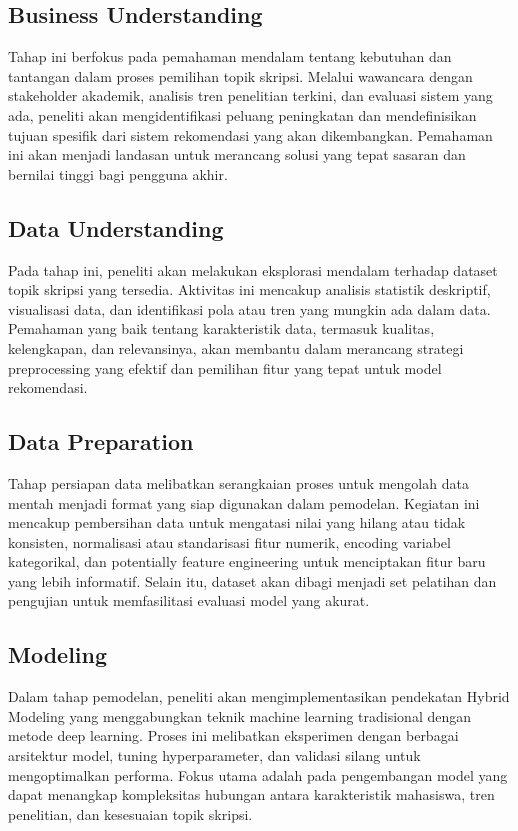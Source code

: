 \subsection{Business Understanding}
Tahap ini berfokus pada pemahaman mendalam tentang kebutuhan dan tantangan dalam proses pemilihan topik skripsi. Melalui wawancara dengan stakeholder akademik, analisis tren penelitian terkini, dan evaluasi sistem yang ada, peneliti akan mengidentifikasi peluang peningkatan dan mendefinisikan tujuan spesifik dari sistem rekomendasi yang akan dikembangkan. Pemahaman ini akan menjadi landasan untuk merancang solusi yang tepat sasaran dan bernilai tinggi bagi pengguna akhir.

\subsection{Data Understanding}
Pada tahap ini, peneliti akan melakukan eksplorasi mendalam terhadap dataset topik skripsi yang tersedia. Aktivitas ini mencakup analisis statistik deskriptif, visualisasi data, dan identifikasi pola atau tren yang mungkin ada dalam data. Pemahaman yang baik tentang karakteristik data, termasuk kualitas, kelengkapan, dan relevansinya, akan membantu dalam merancang strategi preprocessing yang efektif dan pemilihan fitur yang tepat untuk model rekomendasi.

\subsection{Data Preparation}
Tahap persiapan data melibatkan serangkaian proses untuk mengolah data mentah menjadi format yang siap digunakan dalam pemodelan. Kegiatan ini mencakup pembersihan data untuk mengatasi nilai yang hilang atau tidak konsisten, normalisasi atau standarisasi fitur numerik, encoding variabel kategorikal, dan potentially feature engineering untuk menciptakan fitur baru yang lebih informatif. Selain itu, dataset akan dibagi menjadi set pelatihan dan pengujian untuk memfasilitasi evaluasi model yang akurat.

\subsection{Modeling}
Dalam tahap pemodelan, peneliti akan mengimplementasikan pendekatan Hybrid Modeling yang menggabungkan teknik machine learning tradisional dengan metode deep learning. Proses ini melibatkan eksperimen dengan berbagai arsitektur model, tuning hyperparameter, dan validasi silang untuk mengoptimalkan performa. Fokus utama adalah pada pengembangan model yang dapat menangkap kompleksitas hubungan antara karakteristik mahasiswa, tren penelitian, dan kesesuaian topik skripsi.

